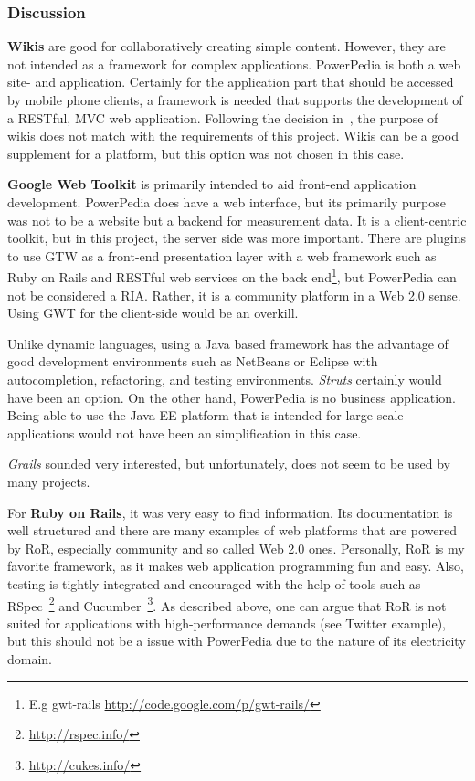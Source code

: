 \subsubsection{Discussion}
\textbf{Wikis} are good for collaboratively creating simple content. However, they are not intended as a framework for complex applications. PowerPedia is both a web site- and application. Certainly for the application part that should be accessed by mobile phone clients, a framework is needed that supports the development of a RESTful, MVC web application. Following the decision in~\cite{merklepp}, the purpose of wikis does not match with the requirements of this project. 
Wikis can be a good supplement for a platform, but this option was not chosen in this case.

\textbf{Google Web Toolkit} is primarily intended to aid front-end application development. PowerPedia does have a web interface, but its primarily purpose was not to be a website but a backend for measurement data. It is a client-centric toolkit, but in this project, the server side was more important. 
There are plugins to use GTW as a front-end presentation layer with a web framework such as Ruby on Rails and RESTful web services on the back end\footnote{E.g gwt-rails \url{http://code.google.com/p/gwt-rails/}}, but PowerPedia can not be considered a RIA. Rather, it is a community platform in a Web 2.0 sense. Using GWT for the client-side would be an overkill. 


Unlike dynamic languages, using a Java based framework has the advantage of good development environments such as NetBeans or Eclipse with autocompletion, refactoring, and testing environments. \textit{Struts} certainly would have been an option. On the other hand, PowerPedia is no business application. Being able to use the Java EE platform that is intended for large-scale applications would not have been an simplification in this case.  

\textit{Grails} sounded very interested, but unfortunately, does not seem to be used by many projects. 

For \textbf{Ruby on Rails}, it was very easy to find information. Its documentation is well structured and there are many examples of web platforms that are powered by RoR, especially community and so called Web 2.0 ones.
Personally, RoR is my favorite framework, as it makes web application programming fun and easy. Also, testing is tightly integrated and encouraged with the help of tools such as RSpec~\footnote{\url{http://rspec.info/}} and Cucumber~\footnote{\url{http://cukes.info/}}. As described above, one can argue that RoR is not suited for applications with high-performance demands (see Twitter example), but this should not be a issue with PowerPedia due to the nature of its electricity domain.  

